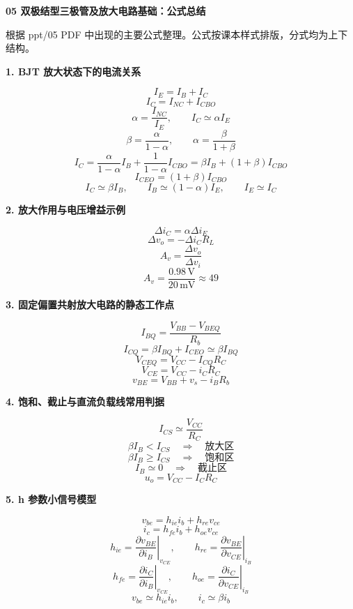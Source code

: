 \documentclass[12pt]{article}
\newcommand{\sectionbox}[1]{%
  \vspace{4pt}
  {\Large\bfseries\color{accent}#1}\par
  \vspace{2pt}
}
\newcommand{\note}[1]{{\color{muted}\small #1}}
\begin{document}
{\huge\bfseries 05 双极结型三极管及放大电路基础：公式总结}

\note{根据 ppt/05 PDF 中出现的主要公式整理。公式按课本样式排版，分式均为上下结构。}

\sectionbox{1. BJT 放大状态下的电流关系}

\begin{tcolorbox}
\[
I_E=I_B+I_C
\]
\[
I_C=I_{NC}+I_{CBO}
\]
\[
\alpha=\frac{I_{NC}}{I_E},\qquad
I_C\simeq \alpha I_E
\]
\[
\beta=\frac{\alpha}{1-\alpha},\qquad
\alpha=\frac{\beta}{1+\beta}
\]
\[
I_C=\frac{\alpha}{1-\alpha}I_B+\frac{1}{1-\alpha}I_{CBO}
=\beta I_B+(1+\beta)I_{CBO}
\]
\[
I_{CEO}=(1+\beta)I_{CBO}
\]
\[
I_C\simeq \beta I_B,\qquad
I_B\simeq (1-\alpha)I_E,\qquad
I_E\simeq I_C
\]
\end{tcolorbox}

\sectionbox{2. 放大作用与电压增益示例}

\begin{tcolorbox}
\[
\Delta i_C=\alpha\Delta i_E
\]
\[
\Delta v_o=-\Delta i_C R_L
\]
\[
A_v=\frac{\Delta v_o}{\Delta v_i}
\]
\[
A_v=\frac{0.98\,\mathrm{V}}{20\,\mathrm{mV}}\approx 49
\]
\end{tcolorbox}

\sectionbox{3. 固定偏置共射放大电路的静态工作点}

\begin{tcolorbox}
\[
I_{BQ}=\frac{V_{BB}-V_{BEQ}}{R_b}
\]
\[
I_{CQ}=\beta I_{BQ}+I_{CEO}\simeq \beta I_{BQ}
\]
\[
V_{CEQ}=V_{CC}-I_{CQ}R_C
\]
\[
V_{CE}=V_{CC}-i_C R_C
\]
\[
v_{BE}=V_{BB}+v_s-i_B R_b
\]
\end{tcolorbox}

\sectionbox{4. 饱和、截止与直流负载线常用判据}

\begin{tcolorbox}
\[
I_{CS}\simeq \frac{V_{CC}}{R_C}
\]
\[
\beta I_B<I_{CS}\quad \Rightarrow\quad \text{放大区}
\]
\[
\beta I_B\ge I_{CS}\quad \Rightarrow\quad \text{饱和区}
\]
\[
I_B\simeq 0\quad \Rightarrow\quad \text{截止区}
\]
\[
u_o=V_{CC}-I_C R_C
\]
\end{tcolorbox}

\sectionbox{5. h 参数小信号模型}

\begin{tcolorbox}
\[
v_{be}=h_{ie}i_b+h_{re}v_{ce}
\]
\[
i_c=h_{fe}i_b+h_{oe}v_{ce}
\]
\[
h_{ie}=\left.\frac{\partial v_{BE}}{\partial i_B}\right|_{v_{CE}},
\qquad
h_{re}=\left.\frac{\partial v_{BE}}{\partial v_{CE}}\right|_{i_B}
\]
\[
h_{fe}=\left.\frac{\partial i_C}{\partial i_B}\right|_{v_{CE}},
\qquad
h_{oe}=\left.\frac{\partial i_C}{\partial v_{CE}}\right|_{i_B}
\]
\[
v_{be}\simeq h_{ie}i_b,\qquad i_c\simeq \beta i_b
\]
\end{tcolorbox}
\end{document}
